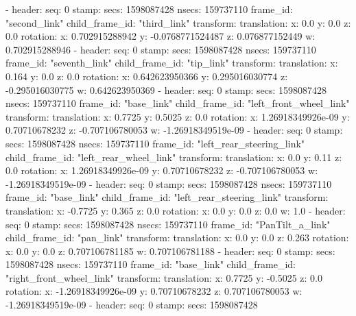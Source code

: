   - 
    header: 
      seq: 0
      stamp: 
        secs: 1598087428
        nsecs: 159737110
      frame_id: "second_link"
    child_frame_id: "third_link"
    transform: 
      translation: 
        x: 0.0
        y: 0.0
        z: 0.0
      rotation: 
        x: 0.702915288942
        y: -0.0768771524487
        z: 0.076877152449
        w: 0.702915288946
  - 
    header: 
      seq: 0
      stamp: 
        secs: 1598087428
        nsecs: 159737110
      frame_id: "seventh_link"
    child_frame_id: "tip_link"
    transform: 
      translation: 
        x: 0.164
        y: 0.0
        z: 0.0
      rotation: 
        x: 0.642623950366
        y: 0.295016030774
        z: -0.295016030775
        w: 0.642623950369
  - 
    header: 
      seq: 0
      stamp: 
        secs: 1598087428
        nsecs: 159737110
      frame_id: "base_link"
    child_frame_id: "left_front_wheel_link"
    transform: 
      translation: 
        x: 0.7725
        y: 0.5025
        z: 0.0
      rotation: 
        x: 1.26918349926e-09
        y: 0.70710678232
        z: -0.707106780053
        w: -1.26918349519e-09
  - 
    header: 
      seq: 0
      stamp: 
        secs: 1598087428
        nsecs: 159737110
      frame_id: "left_rear_steering_link"
    child_frame_id: "left_rear_wheel_link"
    transform: 
      translation: 
        x: 0.0
        y: 0.11
        z: 0.0
      rotation: 
        x: 1.26918349926e-09
        y: 0.70710678232
        z: -0.707106780053
        w: -1.26918349519e-09
  - 
    header: 
      seq: 0
      stamp: 
        secs: 1598087428
        nsecs: 159737110
      frame_id: "base_link"
    child_frame_id: "left_rear_steering_link"
    transform: 
      translation: 
        x: -0.7725
        y: 0.365
        z: 0.0
      rotation: 
        x: 0.0
        y: 0.0
        z: 0.0
        w: 1.0
  - 
    header: 
      seq: 0
      stamp: 
        secs: 1598087428
        nsecs: 159737110
      frame_id: "PanTilt_a_link"
    child_frame_id: "pan_link"
    transform: 
      translation: 
        x: 0.0
        y: 0.0
        z: 0.263
      rotation: 
        x: 0.0
        y: 0.0
        z: 0.707106781185
        w: 0.707106781188
  - 
    header: 
      seq: 0
      stamp: 
        secs: 1598087428
        nsecs: 159737110
      frame_id: "base_link"
    child_frame_id: "right_front_wheel_link"
    transform: 
      translation: 
        x: 0.7725
        y: -0.5025
        z: 0.0
      rotation: 
        x: -1.26918349926e-09
        y: 0.70710678232
        z: 0.707106780053
        w: -1.26918349519e-09
  - 
    header: 
      seq: 0
      stamp: 
        secs: 1598087428
